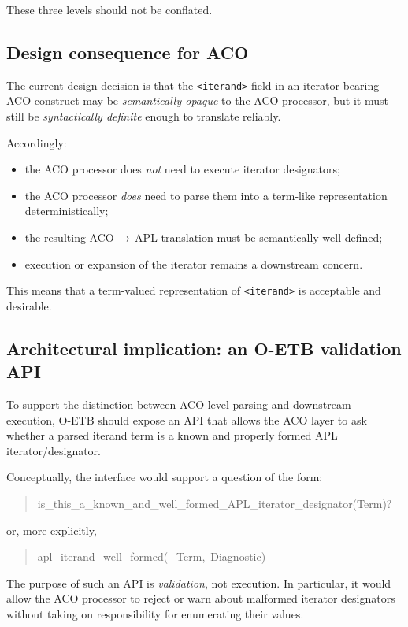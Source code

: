 \documentclass[12pt,twoside,a4paper]{article}
\begin{document}
These three levels should not be conflated.

\subsection{Design consequence for ACO}

The current design decision is that the \texttt{<iterand>} field in an iterator-bearing ACO construct may be \emph{semantically opaque} to the ACO processor, but it must still be \emph{syntactically definite} enough to translate reliably.

Accordingly:

\begin{itemize}
  \item the ACO processor does \emph{not} need to execute iterator designators;
  \item the ACO processor \emph{does} need to parse them into a term-like representation deterministically;
  \item the resulting ACO\,$\rightarrow$\,APL translation must be semantically well-defined;
  \item execution or expansion of the iterator remains a downstream concern.
\end{itemize}

This means that a term-valued representation of \texttt{<iterand>} is acceptable and desirable.

\subsection{Architectural implication: an O-ETB validation API}

To support the distinction between ACO-level parsing and downstream execution, O-ETB should expose an API that allows the ACO layer to ask whether a parsed iterand term is a known and properly formed APL iterator/designator.

Conceptually, the interface would support a question of the form:

\begin{quote}\ttfamily
is\_this\_a\_known\_and\_well\_formed\_APL\_iterator\_designator(Term)?
\end{quote}

or, more explicitly,

\begin{quote}\ttfamily
apl\_iterand\_well\_formed(+Term,\,-Diagnostic)
\end{quote}

The purpose of such an API is \emph{validation}, not execution.
In particular, it would allow the ACO processor to reject or warn about malformed iterator designators without taking on responsibility for enumerating their values.
\end{document}
